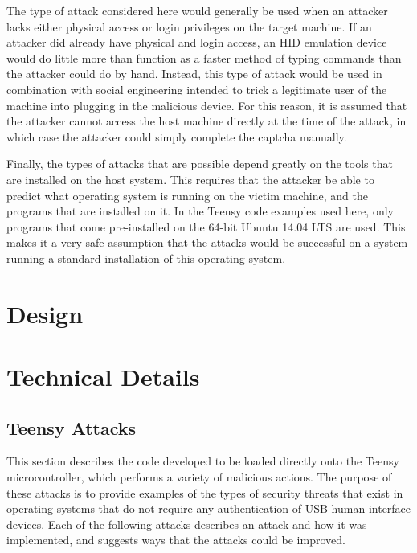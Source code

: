 \documentclass[pagenumbers]{ieee}
\begin{document}
The type of attack considered here would generally be used when an attacker lacks either physical access or login privileges on the target machine. If an attacker did already have physical and login access, an HID emulation device would do little more than function as a faster method of typing commands than the attacker could do by hand. Instead, this type of attack would be used in combination with social engineering intended to trick a legitimate user of the machine into plugging in the malicious device. For this reason, it is assumed that the attacker cannot access the host machine directly at the time of the attack, in which case the attacker could simply complete the captcha manually.

Finally, the types of attacks that are possible depend greatly on the tools that are installed on the host system. This requires that the attacker be able to predict what operating system is running on the victim machine, and the programs that are installed on it.  In the Teensy code examples used here, only programs that come pre-installed on the 64-bit Ubuntu 14.04 LTS are used. This makes it a very safe assumption that the attacks would be successful on a system running a standard installation of this operating system. 


\section{Design}
\label{section:design}


\section{Technical Details}
\label{section:technical}


\subsection{Teensy Attacks}
\label{section:teensy}

This section describes the code developed to be loaded directly onto the Teensy microcontroller, which performs a variety of malicious actions. The purpose of these attacks is to provide examples of the types of security threats that exist in operating systems that do not require any authentication of USB human interface devices. Each of the following attacks describes an attack and how it was implemented, and suggests ways that the attacks could be improved.
\end{document}
